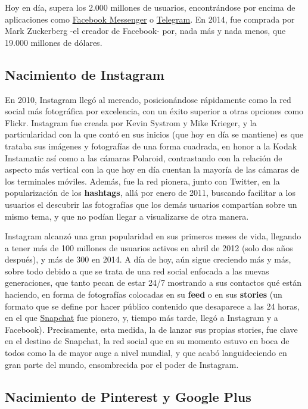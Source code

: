 Hoy en día, supera los 2.000 millones de usuarios, encontrándose por encima de aplicaciones como \href{https://www.facebook.com/messenger}{Facebook Messenger} o \href{https://play.google.com/store/apps/details?id=org.telegram.messenger&hl=es&gl=US}{Telegram}. En 2014, fue comprada por Mark Zuckerberg -el creador de Facebook- por, nada más y nada menos, que 19.000 millones de dólares.

\subsection{Nacimiento de Instagram}

En 2010, Instagram llegó al mercado, posicionándose rápidamente como la red social más fotográfica por excelencia, con un éxito superior a otras opciones como Flickr. Instagram fue creada por Kevin Systrom y Mike Krieger, y la particularidad con la que contó en sus inicios (que hoy en día se mantiene) es que trataba sus imágenes y fotografías de una forma cuadrada, en honor a la Kodak Instamatic así como a las cámaras Polaroid, contrastando con la relación de aspecto más vertical con la que hoy en día cuentan la mayoría de las cámaras de los terminales móviles. Además, fue la red pionera, junto con Twitter, en la popularización de los \textbf{hashtags}, allá por enero de 2011, buscando facilitar a los usuarios el descubrir las fotografías que los demás usuarios compartían sobre un mismo tema, y que no podían llegar a visualizarse de otra manera.

Instagram alcanzó una gran popularidad en sus primeros meses de vida, llegando a tener más de 100 millones de usuarios activos en abril de 2012 (solo dos años después), y más de 300 en 2014. A día de hoy, aún sigue creciendo más y más, sobre todo debido a que se trata de una red social enfocada a las nuevas generaciones, que tanto pecan de estar 24/7 mostrando a sus contactos qué están haciendo, en forma de fotografías colocadas en su \textbf{feed} o en sus \textbf{stories} (un formato que se define por hacer público contenido que desaparece a las 24 horas, en el que \href{https://www.snapchat.com}{Snapchat} fue pionero, y, tiempo más tarde, llegó a Instagram y a Facebook). Precisamente, esta medida, la de lanzar sus propias stories, fue clave en el destino de Snapchat, la red social que en su momento estuvo en boca de todos como la de mayor auge a nivel mundial, y que acabó languideciendo en gran parte del mundo, ensombrecida por el poder de Instagram.

\subsection{Nacimiento de Pinterest y Google Plus}

